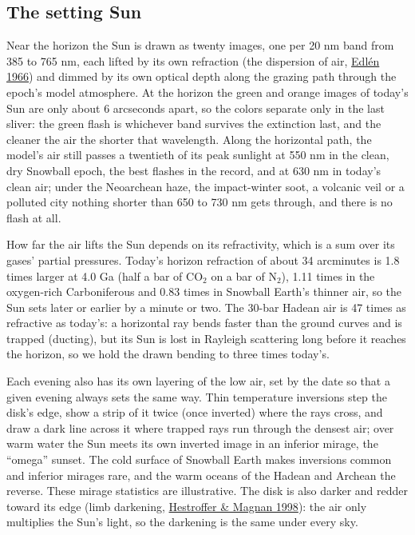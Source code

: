 \documentclass[9pt,twocolumn]{extarticle}
\begin{document}
\subsection{The setting Sun}\label{the-setting-sun}

Near the horizon the Sun is drawn as twenty images, one per 20 nm band from 385 to 765 nm, each lifted by its own refraction (the dispersion of air, \protect\hyperlink{cite.edlen1966}{Edlén 1966}) and dimmed by its own optical depth along the grazing path through the epoch's model atmosphere. At the horizon the green and orange images of today's Sun are only about 6 arcseconds apart, so the colors separate only in the last sliver: the green flash is whichever band survives the extinction last, and the cleaner the air the shorter that wavelength. Along the horizontal path, the model's air still passes a twentieth of its peak sunlight at 550 nm in the clean, dry Snowball epoch, the best flashes in the record, and at 630 nm in today's clean air; under the Neoarchean haze, the impact-winter soot, a volcanic veil or a polluted city nothing shorter than 650 to 730 nm gets through, and there is no flash at all.

How far the air lifts the Sun depends on its refractivity, which is a sum over its gases' partial pressures. Today's horizon refraction of about 34 arcminutes is 1.8 times larger at 4.0 Ga (half a bar of CO$_2$ on a bar of N$_2$), 1.11 times in the oxygen-rich Carboniferous and 0.83 times in Snowball Earth's thinner air, so the Sun sets later or earlier by a minute or two. The 30-bar Hadean air is 47 times as refractive as today's: a horizontal ray bends faster than the ground curves and is trapped (ducting), but its Sun is lost in Rayleigh scattering long before it reaches the horizon, so we hold the drawn bending to three times today's.

Each evening also has its own layering of the low air, set by the date so that a given evening always sets the same way. Thin temperature inversions step the disk's edge, show a strip of it twice (once inverted) where the rays cross, and draw a dark line across it where trapped rays run through the densest air; over warm water the Sun meets its own inverted image in an inferior mirage, the ``omega'' sunset. The cold surface of Snowball Earth makes inversions common and inferior mirages rare, and the warm oceans of the Hadean and Archean the reverse. These mirage statistics are illustrative. The disk is also darker and redder toward its edge (limb darkening, \protect\hyperlink{cite.hestroffer1998}{Hestroffer \& Magnan 1998}): the air only multiplies the Sun's light, so the darkening is the same under every sky.
\end{document}
